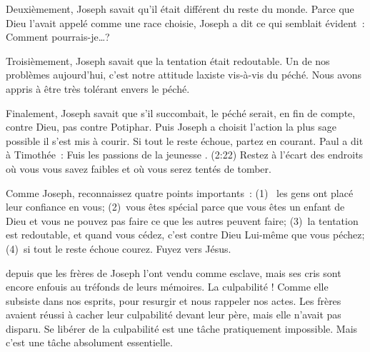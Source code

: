 Deuxièmement, Joseph savait qu'il était différent du reste du monde.
 Parce que Dieu l'avait appelé comme une race choisie,
 Joseph a dit ce qui semblait évident~: \og Comment pourrais-je\dots{}?\fg{}

Troisièmement, Joseph savait que la tentation était redoutable.
 Un de nos problèmes aujourd'hui, c'est notre attitude laxiste
 vis-à-vis du péché.
 Nous avons appris à être très tolérant envers le péché. 

Finalement, Joseph savait que s'il succombait, le péché serait,
 en fin de compte, contre Dieu, pas contre Potiphar.
 Puis Joseph a choisit l'action la plus sage possible
 \ocadr{}il s'est mis à courir.
 Si tout le reste échoue, partez en courant.
 Paul a dit à Timothée~:
 \og Fuis les passions de la jeunesse \fg{}.
 (2:22)
 Restez à l'écart des endroits où vous vous savez faibles
 et où vous serez tentés de tomber. 


Comme Joseph, reconnaissez quatre points importants~:
 (1)~ les gens ont placé leur confiance en vous;
 (2)~vous êtes spécial parce que vous êtes un enfant de Dieu
  et vous ne pouvez pas faire ce que les autres peuvent faire;
 (3)~la tentation est redoutable, et quand vous cédez,
  c'est contre Dieu Lui-même que vous péchez;
 (4)~si tout le reste échoue \ocadr{}courez. Fuyez vers Jésus.

\dvrule






 depuis que les frères de Joseph
 l'ont vendu comme esclave, mais ses cris sont encore enfouis
 au tréfonds de leurs mémoires. La culpabilité !
 Comme elle subsiste dans nos esprits, pour resurgir
 et nous rappeler nos actes.
 Les frères avaient réussi à cacher leur culpabilité devant leur père,
 mais elle n'avait pas disparu.
 Se libérer de la culpabilité est une tâche pratiquement impossible.
 Mais c'est une tâche absolument essentielle. 

